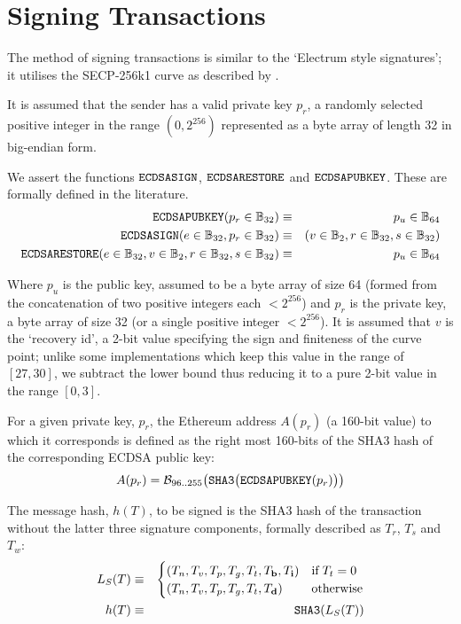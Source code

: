 \documentclass[9pt,oneside]{amsart}
\begin{document}
\section{Signing Transactions}\label{app:signing}

The method of signing transactions is similar to the `Electrum style signatures'; it utilises the SECP-256k1 curve as described by \cite{gura2004comparing}.

It is assumed that the sender has a valid private key $p_r$, a randomly selected positive integer in the range $(0, 2^{256})$ represented as a byte array of length 32 in big-endian form.

We assert the functions $\mathtt{\small ECDSASIGN}$, $\mathtt{\small ECDSARESTORE}$ and $\mathtt{\small ECDSAPUBKEY}$. These are formally defined in the literature.
\begin{eqnarray}
\mathtt{\small ECDSAPUBKEY}(p_r \in \mathbb{B}_{32}) & \equiv & p_u \in \mathbb{B}_{64} \\
\mathtt{\small ECDSASIGN}(e \in \mathbb{B}_{32}, p_r \in \mathbb{B}_{32}) & \equiv & (v \in \mathbb{B}_{2}, r \in \mathbb{B}_{32}, s \in \mathbb{B}_{32}) \\
\mathtt{\small ECDSARESTORE}(e \in \mathbb{B}_{32}, v \in \mathbb{B}_{2}, r \in \mathbb{B}_{32}, s \in \mathbb{B}_{32}) & \equiv & p_u \in \mathbb{B}_{64}
\end{eqnarray}

Where $p_u$ is the public key, assumed to be a byte array of size 64 (formed from the concatenation of two positive integers each $< 2^{256}$) and $p_r$ is the private key, a byte array of size 32 (or a single positive integer $< 2^{256}$). It is assumed that $v$ is the `recovery id', a 2-bit value specifying the sign and finiteness of the curve point; unlike some implementations which keep this value in the range of $[27, 30]$, we subtract the lower bound thus reducing it to a pure 2-bit value in the range $[0, 3]$.

For a given private key, $p_r$, the Ethereum address $A(p_r)$ (a 160-bit value) to which it corresponds is defined as the right most 160-bits of the SHA3 hash of the corresponding ECDSA public key:
\begin{equation}
A(p_r) = \mathcal{B}_{96..255}\big(\mathtt{\tiny SHA3}\big( \mathtt{\small ECDSAPUBKEY}(p_r) \big) \big)
\end{equation}

The message hash, $h(T)$, to be signed is the SHA3 hash of the transaction without the latter three signature components, formally described as $T_r$, $T_s$ and $T_w$:
\begin{eqnarray}
L_S(T) & \equiv & \begin{cases}
(T_n, T_v, T_p, T_g, T_t, T_\mathbf{b}, T_\mathbf{i}) & \text{if} \; T_t = 0\\
(T_n, T_v, T_p, T_g, T_t, T_\mathbf{d}) & \text{otherwise} \end{cases} \\
h(T) & \equiv & \mathtt{\small SHA3}( L_S(T) )
\end{eqnarray}
\end{document}

